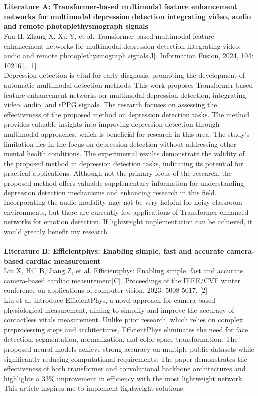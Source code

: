 \documentclass[11pt]{article}
\begin{document}
\\
\\\textbf{Literature A: Transformer-based multimodal feature enhancement networks for multimodal depression detection integrating video, audio and remote photoplethysmograph signals}
\\Fan H, Zhang X, Xu Y, et al. Transformer-based multimodal feature enhancement networks for multimodal depression detection integrating video, audio and remote photoplethysmograph signals[J]. Information Fusion, 2024, 104: 102161. [1]
\\Depression detection is vital for early diagnosis, prompting the development of automatic multimodal detection methods. This work proposes Transformer-based feature enhancement networks for multimodal depression detection, integrating video, audio, and rPPG signals. The research focuses on assessing the effectiveness of the proposed method on depression detection tasks. The method provides valuable insights into improving depression detection through multimodal approaches, which is beneficial for research in this area. The study's limitation lies in the focus on depression detection without addressing other mental health conditions. The experimental results demonstrate the validity of the proposed method in depression detection tasks, indicating its potential for practical applications. Although not the primary focus of the research, the proposed method offers valuable supplementary information for understanding depression detection mechanisms and enhancing research in this field. Incorporating the audio modality may not be very helpful for noisy classroom environments, but there are currently few applications of Transformer-enhanced networks for emotion detection. If lightweight implementation can be achieved, it would greatly benefit my research.
\\
\\\textbf{Literature B: Efficientphys: Enabling simple, fast and accurate camera-based cardiac measurement}
\\Liu X, Hill B, Jiang Z, et al. Efficientphys: Enabling simple, fast and accurate camera-based cardiac measurement[C]. Proceedings of the IEEE/CVF winter conference on applications of computer vision. 2023: 5008-5017. [2]
\\Liu et al. introduce EfficientPhys, a novel approach for camera-based physiological measurement, aiming to simplify and improve the accuracy of contactless vitals measurement. Unlike prior research, which relies on complex preprocessing steps and architectures, EfficientPhys eliminates the need for face detection, segmentation, normalization, and color space transformation. The proposed neural models achieve strong accuracy on multiple public datasets while significantly reducing computational requirements. The paper demonstrates the effectiveness of both transformer and convolutional backbone architectures and highlights a 33$\%$ improvement in efficiency with the most lightweight network. This article inspires me to implement lightweight solutions.
\end{document}
